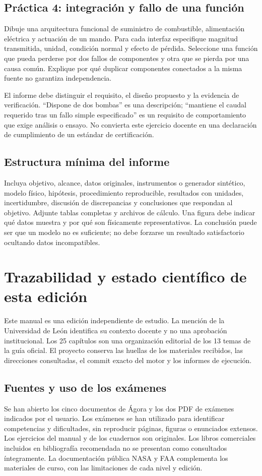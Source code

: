 \section{Práctica 4: integración y fallo de una función}
Dibuje una arquitectura funcional de suministro de combustible, alimentación eléctrica y actuación de un mando. Para cada interfaz especifique magnitud transmitida, unidad, condición normal y efecto de pérdida. Seleccione una función que pueda perderse por dos fallos de componentes y otra que se pierda por una causa común. Explique por qué duplicar componentes conectados a la misma fuente no garantiza independencia.

El informe debe distinguir el requisito, el diseño propuesto y la evidencia de verificación. ``Dispone de dos bombas'' es una descripción; ``mantiene el caudal requerido tras un fallo simple especificado'' es un requisito de comportamiento que exige análisis o ensayo. No convierta este ejercicio docente en una declaración de cumplimiento de un estándar de certificación.

\section{Estructura mínima del informe}
Incluya objetivo, alcance, datos originales, instrumentos o generador sintético, modelo físico, hipótesis, procedimiento reproducible, resultados con unidades, incertidumbre, discusión de discrepancias y conclusiones que respondan al objetivo. Adjunte tablas completas y archivos de cálculo. Una figura debe indicar qué datos muestra y por qué son físicamente representativos. La conclusión puede ser que un modelo no es suficiente; no debe forzarse un resultado satisfactorio ocultando datos incompatibles.

\chapter{Trazabilidad y estado científico de esta edición}\label{ap:auditoria}
Este manual es una edición independiente de estudio. La mención de la Universidad de León identifica su contexto docente y no una aprobación institucional. Los 25 capítulos son una organización editorial de los 13 temas de la guía oficial. El proyecto conserva las huellas de los materiales recibidos, las direcciones consultadas, el commit exacto del motor y los informes de ejecución.

\section{Fuentes y uso de los exámenes}
Se han abierto los cinco documentos de Ágora y los dos PDF de exámenes indicados por el usuario. Los exámenes se han utilizado para identificar competencias y dificultades, sin reproducir páginas, figuras o enunciados extensos. Los ejercicios del manual y de los cuadernos son originales. Los libros comerciales incluidos en bibliografía recomendada no se presentan como consultados íntegramente. La documentación pública NASA y FAA complementa los materiales de curso, con las limitaciones de cada nivel y edición.

